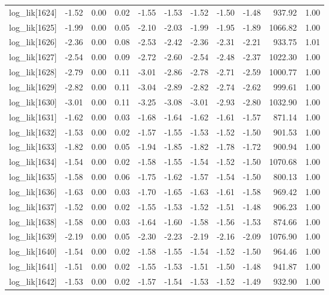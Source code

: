 \begin{table}[ht]
\begin{tabular}{rrrrrrrrrrr}
  log\_lik[1624] & -1.52 & 0.00 & 0.02 & -1.55 & -1.53 & -1.52 & -1.50 & -1.48 & 937.92 & 1.00 \\ 
  log\_lik[1625] & -1.99 & 0.00 & 0.05 & -2.10 & -2.03 & -1.99 & -1.95 & -1.89 & 1066.82 & 1.00 \\ 
  log\_lik[1626] & -2.36 & 0.00 & 0.08 & -2.53 & -2.42 & -2.36 & -2.31 & -2.21 & 933.75 & 1.01 \\ 
  log\_lik[1627] & -2.54 & 0.00 & 0.09 & -2.72 & -2.60 & -2.54 & -2.48 & -2.37 & 1022.30 & 1.00 \\ 
  log\_lik[1628] & -2.79 & 0.00 & 0.11 & -3.01 & -2.86 & -2.78 & -2.71 & -2.59 & 1000.77 & 1.00 \\ 
  log\_lik[1629] & -2.82 & 0.00 & 0.11 & -3.04 & -2.89 & -2.82 & -2.74 & -2.62 & 999.61 & 1.00 \\ 
  log\_lik[1630] & -3.01 & 0.00 & 0.11 & -3.25 & -3.08 & -3.01 & -2.93 & -2.80 & 1032.90 & 1.00 \\ 
  log\_lik[1631] & -1.62 & 0.00 & 0.03 & -1.68 & -1.64 & -1.62 & -1.61 & -1.57 & 871.14 & 1.00 \\ 
  log\_lik[1632] & -1.53 & 0.00 & 0.02 & -1.57 & -1.55 & -1.53 & -1.52 & -1.50 & 901.53 & 1.00 \\ 
  log\_lik[1633] & -1.82 & 0.00 & 0.05 & -1.94 & -1.85 & -1.82 & -1.78 & -1.72 & 900.94 & 1.00 \\ 
  log\_lik[1634] & -1.54 & 0.00 & 0.02 & -1.58 & -1.55 & -1.54 & -1.52 & -1.50 & 1070.68 & 1.00 \\ 
  log\_lik[1635] & -1.58 & 0.00 & 0.06 & -1.75 & -1.62 & -1.57 & -1.54 & -1.50 & 800.13 & 1.00 \\ 
  log\_lik[1636] & -1.63 & 0.00 & 0.03 & -1.70 & -1.65 & -1.63 & -1.61 & -1.58 & 969.42 & 1.00 \\ 
  log\_lik[1637] & -1.52 & 0.00 & 0.02 & -1.55 & -1.53 & -1.52 & -1.51 & -1.48 & 906.23 & 1.00 \\ 
  log\_lik[1638] & -1.58 & 0.00 & 0.03 & -1.64 & -1.60 & -1.58 & -1.56 & -1.53 & 874.66 & 1.00 \\ 
  log\_lik[1639] & -2.19 & 0.00 & 0.05 & -2.30 & -2.23 & -2.19 & -2.16 & -2.09 & 1076.90 & 1.00 \\ 
  log\_lik[1640] & -1.54 & 0.00 & 0.02 & -1.58 & -1.55 & -1.54 & -1.52 & -1.50 & 964.46 & 1.00 \\ 
  log\_lik[1641] & -1.51 & 0.00 & 0.02 & -1.55 & -1.53 & -1.51 & -1.50 & -1.48 & 941.87 & 1.00 \\ 
  log\_lik[1642] & -1.53 & 0.00 & 0.02 & -1.57 & -1.54 & -1.53 & -1.52 & -1.49 & 932.90 & 1.00 \\ 

\end{tabular}
\end{table}
